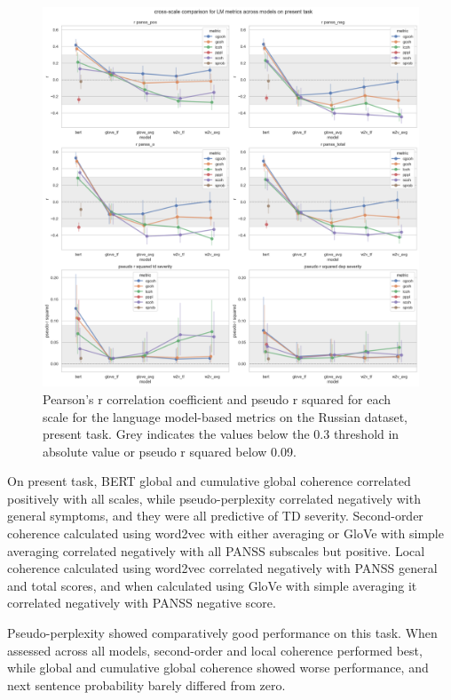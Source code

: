 \begin{figure}[ht!]
    \includegraphics[width=1.1\textwidth, center]{Figures/chapter_4/LM/ru_present_scale_r.png} 
\captionsetup{width=\textwidth}
\caption[LM Metrics: Russian, Present Task]{\label{fig:results:lm:ru:pr} Pearson's r correlation coefficient and pseudo r squared for each scale for the language model-based metrics on the Russian dataset, present task. Grey indicates the values below the 0.3 threshold in absolute value or pseudo r squared below 0.09.}
\end{figure}

On present task, BERT global and cumulative global coherence correlated positively with all scales, while pseudo-perplexity correlated negatively with general symptoms, and they were all predictive of TD severity. Second-order coherence calculated using word2vec with either averaging or GloVe with simple averaging correlated negatively with all PANSS subscales but positive. Local coherence calculated using word2vec correlated negatively with PANSS general and total scores, and when calculated using GloVe with simple averaging it correlated negatively with PANSS negative score.

Pseudo-perplexity showed comparatively good performance on this task. When assessed across all models, second-order and local coherence performed best, while global and cumulative global coherence showed worse performance, and next sentence probability barely differed from zero. 

